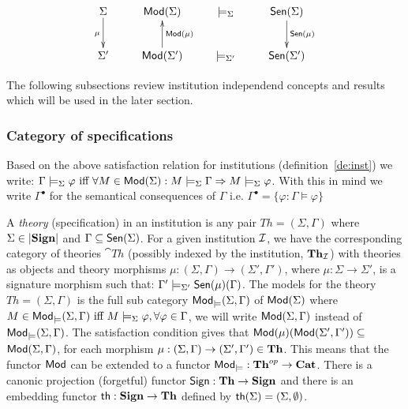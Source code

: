 \[\xymatrix{
	\Sigma \ar[d]_{\mu}
		& {\Mod}(\Sigma)
			& \models_{\Sigma}
				& \Sen(\Sigma) \ar[d]^{\Sen(\mu)}	\\
	\Sigma'
		& {\Mod}(\Sigma') \ar[u]_{{\Mod}(\mu)}
			& \models_{\Sigma'}
				& \Sen(\Sigma')			\\
								}
\]

The following subsections review
institution independend concepts and results which will be
used in the later section.



\subsubsection{Category of specifications}\label{sub:catspec}
Based on the above satisfaction relation for institutions (definition~\ref{de:inst}) we write: $\Gamma \models_{\Sigma}
 \varphi \mbox{ iff } \forall M \in {\sf {Mod}}(\Sigma): M \models_{\Sigma} \Gamma
 \Rightarrow M \models_{\Sigma} \varphi $.  With this in mind we write
 $\Gamma^{\bullet}$ for the semantical consequences of $\Gamma$
 i.e. $\Gamma^{\bullet} = \{ \varphi: \Gamma \models \varphi \}$
 
A {\em theory} (specification) in an institution is any pair
${Th}=(\Sigma,\Gamma)$ where $\Sigma\in|{\bf Sign}|$ and $\Gamma\subseteq
{\sf {Sen}}(\Sigma)$. For a given institution ${\mathcal{I}}$, we have the corresponding
category of theories $\cat{Th}$ (possibly indexed by the institution,
${\bf Th_{{\mathcal{I}}}}$) with theories as objects and theory morphisms
$\mu:(\Sigma,\Gamma) \to (\Sigma',\Gamma')$, where $\mu:\Sigma \to \Sigma'$,
is a signature morphism such that: $\Gamma'
\models_{\Sigma'} {\sf {Sen}}(\mu)(\Gamma)$.  The models for the theory
${Th}=(\Sigma,\Gamma)$ is the full sub category
${\sf {Mod}}_{\models}(\Sigma,\Gamma)$ of ${\sf {Mod}}(\Sigma)$ where $M \in
{\sf {Mod}}_{\models}(\Sigma,\Gamma) \mbox{ iff } M \models_{\Sigma} \varphi,
\forall \varphi \in \Gamma$, we will write ${\sf {Mod}}(\Sigma,\Gamma)$ instead of
${\sf {Mod}}_{\models}(\Sigma,\Gamma)$.  The satisfaction condition gives that
${\sf {Mod}}(\mu)({\sf {Mod}}(\Sigma',\Gamma')) \subseteq$ %
${\sf {Mod}}(\Sigma,\Gamma)$, for each morphism $\mu:(\Sigma,\Gamma) \to (\Sigma',\Gamma') \in {\bf Th}$. This means that the functor ${\sf {Mod}}$ can be
extended to a functor ${\sf {Mod}}_{\models}:{\bf Th}^{op} \to {\bf Cat}$. There is
a canonic projection (forgetful) functor ${\sf {Sign}}:{\bf Th} \to {\bf Sign}$ and there is
an embedding functor ${\sf {th}}: {\bf Sign} \to {\bf Th}$ defined by
${\sf {th}}(\Sigma)= (\Sigma,\emptyset)$.

